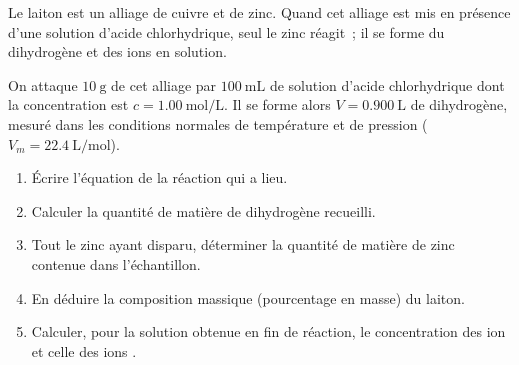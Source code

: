 Le laiton est un alliage de cuivre et de zinc. Quand cet alliage est mis en
présence d'une solution d'acide chlorhydrique, seul le zinc réagit~; il se forme
du dihydrogène et des ions  en solution.

On attaque $\qty{10}{\g}$ de cet alliage par $\qty{100}{\mL}$ de solution
d'acide chlorhydrique dont la concentration est $c=\qty{1.00}{\mol\per\L}$. Il
se forme alors $V=\qty{0.900}{\L}$ de dihydrogène, mesuré dans les conditions
normales de température et de pression ($V_{m}=\qty{22.4}{\L\per\mol}$).
\begin{enumerate}
    \item Écrire l'équation de la réaction qui a lieu.
    \item Calculer la quantité de matière de dihydrogène recueilli.
    \item Tout le zinc ayant disparu, déterminer la quantité de matière de zinc
          contenue dans l'échantillon.
    \item En déduire la composition massique (pourcentage en masse) du laiton.
    \item Calculer, pour la solution obtenue en fin de réaction, le
          concentration des ion  et celle des ions
          .
\end{enumerate}

